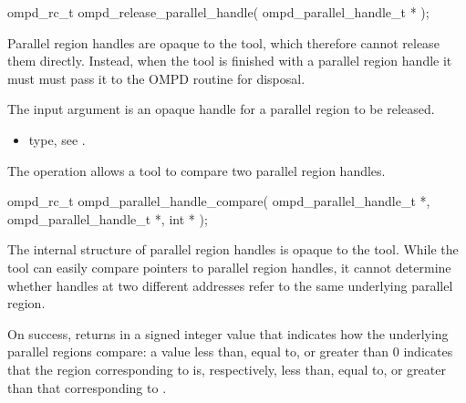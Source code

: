 \format

\begin{cspecific}
\begin{ompSyntax}
ompd_rc_t ompd_release_parallel_handle(
  ompd_parallel_handle_t *
);
\end{ompSyntax}
\end{cspecific}


\descr
Parallel region handles are opaque to the tool, which therefore
cannot release them directly. Instead, when the tool is finished with a parallel region handle
it must must pass it to the OMPD 
routine for disposal.

\argdesc
The input argument  is an opaque handle for a parallel region
to be released.

\crossreferences
\begin{itemize}
	\item {} type, see .
\end{itemize}

\label{ompd:ompd_parallel_handle_compare}
\summary
The  operation allows a tool to compare two 
parallel region handles.

\format

\begin{cspecific}
\begin{ompSyntax}
ompd_rc_t ompd_parallel_handle_compare(
  ompd_parallel_handle_t *,
  ompd_parallel_handle_t *,
  int *
);
\end{ompSyntax}
\end{cspecific}


\descr
The internal structure of parallel region handles is opaque to the tool. While the tool can easily 
compare pointers to parallel region handles, it cannot determine whether handles at two different 
addresses refer to the same underlying parallel region.

On success,  returns in  a signed 
integer value that indicates how the underlying parallel regions compare: a value less than, equal 
to, or greater than 0 indicates that the region corresponding to  is,
respectively, less than, equal to, or greater than that corresponding to .

